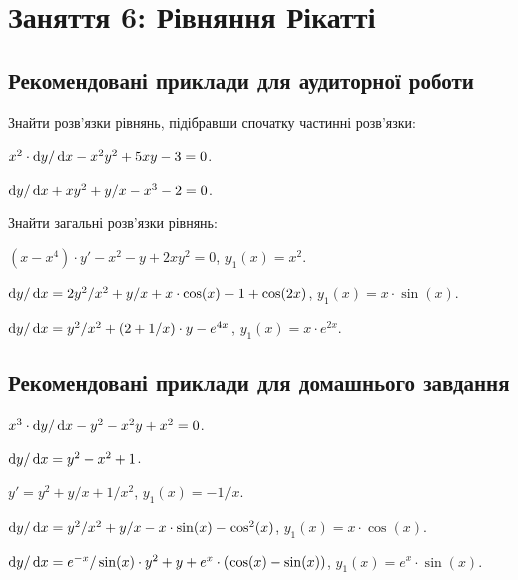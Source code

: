 \section*{Заняття 6: Рівняння Рікатті}

\subsection*{Рекомендовані приклади для аудиторної роботи}

Знайти розв'язки рівнянь, підібравши спочатку частинні розв'язки:

\begin{problem}
	$x^2 \cdot \mathop{}\!\mathrm{d} y / \mathop{}\!\mathrm{d} x - x^2 y^2 + 5 x y - 3 = 0$.
\end{problem}

\begin{problem}
	$\mathop{}\!\mathrm{d} y / \mathop{}\!\mathrm{d} x + x y^2 + y / x - x^3 - 2 = 0$.
\end{problem}

Знайти загальні розв'язки рівнянь:

\begin{problem}
	$(x - x^4) \cdot y' - x^2 - y + 2 x y^2 = 0$, $y_1(x) = x^2$.
\end{problem}

\begin{problem}
	$\mathop{}\!\mathrm{d} y / \mathop{}\!\mathrm{d} x = 2 y^2 / x^2 + y / x + x \cdot \cos (x) - 1 + \cos (2 x)$, $y_1(x) = x \cdot \sin (x)$.
\end{problem}

\begin{problem}
	$\mathop{}\!\mathrm{d} y / \mathop{}\!\mathrm{d} x = y^2 / x^2 + (2 + 1 / x) \cdot y - e^{4x}$, $y_1(x) = x \cdot e^{2 x}$.
\end{problem}

\subsection*{Рекомендовані приклади для домашнього завдання}

\begin{problem}
	$x^3 \cdot \mathop{}\!\mathrm{d} y / \mathop{}\!\mathrm{d} x - y^2 - x^2 y + x^2 = 0$.
\end{problem}

\begin{problem}
	$\mathop{}\!\mathrm{d} y / \mathop{}\!\mathrm{d} x = y^2 - x^2 + 1$.
\end{problem}

\begin{problem}
	$y' = y^2 + y / x + 1 / x^2$, $y_1(x) = - 1 / x$.
\end{problem}

\begin{problem}
	$\mathop{}\!\mathrm{d} y / \mathop{}\!\mathrm{d} x = y^2 / x^2 + y / x - x \cdot \sin (x) - \cos^2 (x)$, $y_1(x) = x \cdot \cos (x)$.
\end{problem}

\begin{problem}
	$\mathop{}\!\mathrm{d} y / \mathop{}\!\mathrm{d} x = e^{-x} / \sin (x) \cdot y^2 + y + e^x \cdot (\cos (x) - \sin (x))$, $y_1(x) = e^x \cdot \sin (x)$.
\end{problem}
